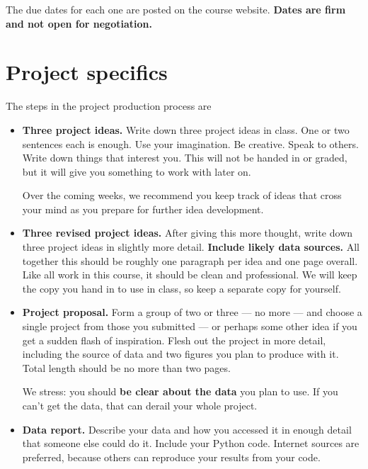 \documentclass[11pt]{article}
\begin{document}
The due dates for each one are posted on the course website.
{\bf Dates are firm and not open for negotiation.}


\section*{Project specifics}

The steps in the project production process are
\begin{itemize}

\item {\bf Three project ideas.}
Write down three project ideas in class.
One or two sentences each is enough.
Use your imagination.  Be creative.  Speak to others.
Write down things that interest you.
This will not be handed in or graded, but it will give you something to work with later on.

Over the coming weeks, we recommend you keep track of ideas that cross
your mind as you prepare for further idea development.


\item {\bf Three revised project ideas.}
After giving this more thought, write down three project ideas in slightly more detail.
{\bf Include likely data sources.}
All together this should be roughly one paragraph per idea and one page overall.
Like all work in this course, it should be clean and professional.
We will keep the copy you hand in to use in class, so keep a separate copy for yourself.

\item{\bf Project proposal.}
Form a group of two or three --- no more ---
and choose a single project from those you submitted ---
or perhaps some other idea if you get a sudden flash of inspiration.
Flesh out the project in more detail, including the source of data and
two figures you plan to produce with it.
Total length should be no more than two pages.

We stress:  you should {\bf be clear about the data} you plan to use.
If you can't get the data, that can derail your whole project.

\item {\bf Data report.}
Describe your data and how you accessed it in enough detail that someone else could do it.
Include your Python code.  %
Internet sources are preferred, because others can reproduce your results from your code.



\end{itemize}
\end{document}
